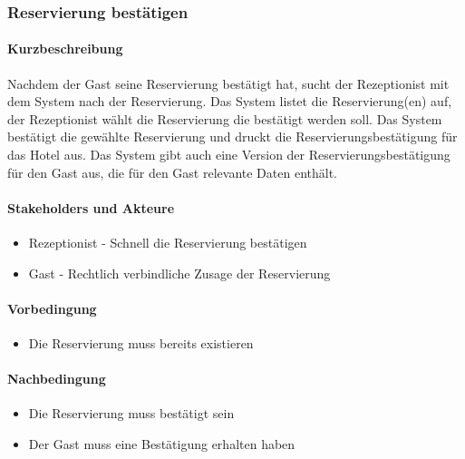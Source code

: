 \subsubsection{Reservierung bestätigen}

\paragraph{Kurzbeschreibung}
Nachdem der \Gls{Gast} seine \Gls{Reservierung} bestätigt hat, sucht der \Gls{Rezeptionist} mit dem System nach der \Gls{Reservierung}. Das System listet die \Gls{Reservierung}(en) auf, der \Gls{Rezeptionist} wählt die \Gls{Reservierung} die bestätigt werden soll. Das System bestätigt die gewählte \Gls{Reservierung} und druckt die Reservierungsbestätigung für das Hotel aus. Das System gibt auch eine Version der Reservierungsbestätigung für den \Gls{Gast} aus, die für den \Gls{Gast} relevante Daten enthält.

\paragraph{Stakeholders und Akteure}
\begin{itemize}
	\item \Gls{Rezeptionist} - Schnell die \Gls{Reservierung} bestätigen
	\item \Gls{Gast} - Rechtlich verbindliche Zusage der \Gls{Reservierung}
\end{itemize}

\paragraph{Vorbedingung}
\begin{itemize}
	\item Die \Gls{Reservierung} muss bereits existieren
\end{itemize}

\paragraph{Nachbedingung}
\begin{itemize}
	\item Die \Gls{Reservierung} muss bestätigt sein
	\item Der \Gls{Gast} muss eine Bestätigung erhalten haben
\end{itemize}

